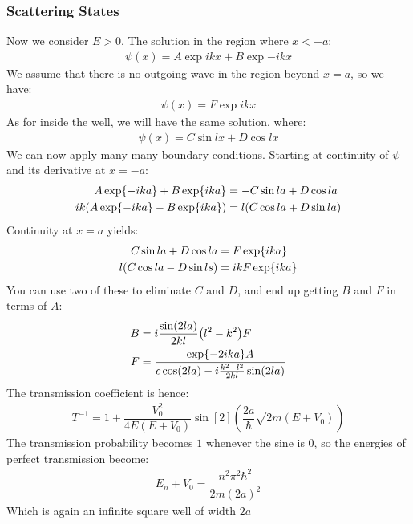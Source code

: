 \subsubsection{Scattering States}
Now we consider $E>0$, The solution in the region where $x<-a$:
\begin{align*}
  \psi(x)=A\exp{ikx}+B\exp{-ikx}
\end{align*}
We assume that there is no outgoing wave in the region beyond $x=a$, so we have:
\begin{align*}
  \psi(x)=F\exp{ikx}
\end{align*}
As for inside the well, we will have the same solution, where:
\begin{align*}
  \psi(x)=C\sin lx+D\cos lx
\end{align*}
We can now apply many many boundary conditions. Starting at continuity of $\psi$ and its derivative at $x=-a$:
\begin{align*}
  A\exp{-ika}+B\exp{ika}&=-C\sin la + D\cos la \\
  ik\qty(A\exp{-ika}-B\exp{ika})&=l\qty(C\cos la+D\sin la)
\end{align*}
Continuity at $x=a$ yields:
\begin{align*}
  C\sin la+ D\cos la&=F\exp{ika} \\
  l\qty(C\cos la-D\sin ls)&=ikF\exp{ika}
\end{align*}
You can use two of these to eliminate $C$ and $D$, and end up getting $B$ and $F$ in terms of $A$:
\begin{align*}
  B&=i\dfrac{\sin(2la)}{2kl}\qty(l^2-k^2)F \\
  F&=\dfrac{\exp{-2ika}A}{c\cos(2la)-i\frac{k^2+l^2}{2kl}\sin(2la)}
\end{align*}
The transmission coefficient is hence:
\begin{align*}
  T^{-1}=1+\dfrac{V_0^2}{4E(E+V_0)}\sin[2](\dfrac{2a}{\hbar}\sqrt{2m(E+V_0)})
\end{align*}
The transmission probability becomes $1$ whenever the sine is $0$, so the energies of perfect transmission become:
\begin{align*}
  E_n+V_0=\dfrac{n^2\pi^2\hbar^2}{2m(2a)^2}
\end{align*}
Which is again an infinite square well of width $2a$